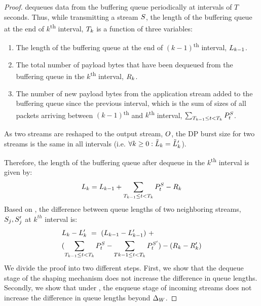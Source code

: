 \begin{proof}
    {\sys} dequeues data from the buffering queue periodically at intervals of $T$
    seconds.
    Thus, while transmitting a stream $S$, the length of the buffering queue
    at the end of $k$\textsuperscript{th} interval, $T_{k}$ is a function of
    three variables:
    \begin{enumerate}
            \item The length of the buffering queue at the end of
            $(k-1)$\textsuperscript{th} interval, $L_{k-1}$.
            \item The total number of payload bytes that have been dequeued from the
            buffering queue in the $k$\textsuperscript{th} interval,
            ${R}_{k}$.
            \item The number of new payload bytes from the application stream added
            to the buffering queue since the previous interval, which is the sum of
            sizes of all packets arriving between $(k-1)$\textsuperscript{th} and
            $k$\textsuperscript{th} interval, \ie
            $\sum_{T_{k-1} \leq t < T_{k}} P^S_t$.
    \end{enumerate}
    As two streams are reshaped to the output stream, $O$, the DP burst size for two streams is the same in all intervals (i.e. $\forall k \geq 0 : \tilde{L}_{k} = \tilde{L}_{k}'$).
    
    Therefore, the length of the buffering queue after dequeue in the
    $k$\textsuperscript{th} interval is given by:
    \begin{equation}
    L_{k} =
    {L_{k-1}}
    +
    {\sum_{T_{k-1} \leq t < T_{k}} P^S_t}
    -
    {{R}_{k}}
    \label{equ:queue-state}
    \end{equation}
    Based on , the difference between queue lengths of two
    neighboring streams, $S_{j}, S_{j}'$ at $k^{th}$ interval is:
    \begin{align}\label{equ:queue_state_expansion}
    & L_{k} - L_{k}'~=~(L_{k-1} - L_{k-1}')~+\\
    \nonumber
    & (\sum_{T_{k-1} \leq t < T_{k}}P^S_t - \sum_{T{k-1} \leq t < T_{k}}P^{S'}_t)
    -
    ({R}_{k} - {R}_{k}')
    \end{align}
    We divide the proof into two different steps.
    First, we show that the dequeue stage of the shaping mechanism does not increase the difference in queue lengths.
    Secondly, we show that under , the enqueue stage of incoming streams does not increase the difference in queue lengths beyond $\Delta_{W}$.
    

\end{proof}

